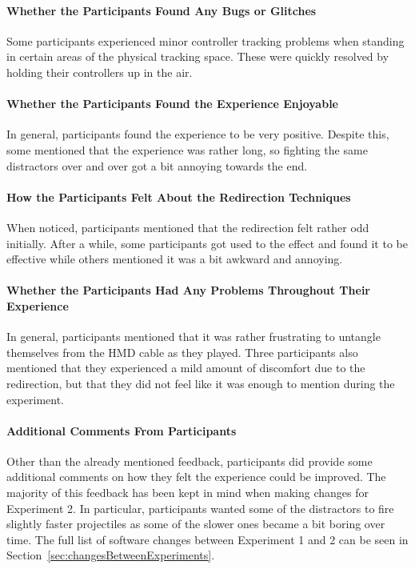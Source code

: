 \paragraph{Whether the Participants Found Any Bugs or Glitches}
Some participants experienced minor controller tracking problems when standing in certain areas of the physical tracking space. These were quickly resolved by holding their controllers up in the air. 

\paragraph{Whether the Participants Found the Experience Enjoyable}
In general, participants found the experience to be very positive. Despite this, some mentioned that the experience was rather long, so fighting the same distractors over and over got a bit annoying towards the end.

\paragraph{How the Participants Felt About the Redirection Techniques}
When noticed, participants mentioned that the redirection felt rather odd initially. After a while, some participants got used to the effect and found it to be effective while others mentioned it was a bit awkward and annoying. 

\paragraph{Whether the Participants Had Any Problems Throughout Their Experience}
In general, participants mentioned that it was rather frustrating to untangle themselves from the HMD cable as they played. Three participants also mentioned that they experienced a mild amount of discomfort due to the redirection, but that they did not feel like it was enough to mention during the experiment. 

\paragraph{Additional Comments From Participants}
Other than the already mentioned feedback, participants did provide some additional comments on how they felt the experience could be improved. The majority of this feedback has been kept in mind when making changes for Experiment 2. In particular, participants wanted some of the distractors to fire slightly faster projectiles as some of the slower ones became a bit boring over time. The full list of software changes between Experiment 1 and 2 can be seen in Section~\ref{sec:changesBetweenExperiments}.

